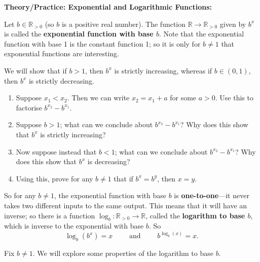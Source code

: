 \documentclass{article}
\begin{document}
\vfill



\clearpage



\textbf{Theory/Practice: Exponential and Logarithmic Functions:}

\vspace{5mm}



Let $b\in\mathbb{R}_{>0}$ (so $b$ is a positive real number). The function $\mathbb{R}\to\mathbb{R}_{>0}$ given by $b^x$ is called the \textbf{exponential function with base $b$}. Note that the exponential function with base 1 is the constant function 1; so it is only for $b\neq 1$ that exponential functions are interesting.

We will show that if $b>1$, then $b^x$ is strictly increasing, whereas if $b\in (0,1)$, then $b^x$ is strictly decreasing.
\begin{enumerate}
	\item Suppose $x_1<x_2$. Then we can write $x_2=x_1+a$ for some $a>0$. Use this to factorise $b^{x_2}-b^{x_1}$.
	\item Suppose $b>1$; what can we conclude about $b^{x_2}-b^{x_1}$? Why does this show that $b^x$ is strictly increasing?
	\item Now suppose instead that $b<1$; what can we conclude about $b^{x_2}-b^{x_1}$? Why does this show that $b^x$ is decreasing?
	\item Using this, prove for any $b\neq 1$ that if $b^x=b^y$, then $x=y$.
\end{enumerate}

So for any $b\neq 1$, the exponential function with base $b$ is \textbf{one-to-one}---it never takes two different inputs to the same output. This means that it will have an inverse; so there is a function $\log_b:\mathbb{R}_{>0}\to\mathbb{R}$, called the \textbf{logarithm to base $b$}, which is inverse to the exponential with base $b$. So
\[\log_b(b^x)=x\qquad\mbox{ and }\qquad b^{\log_b(x)}=x.\]

\noindent Fix $b\neq1$. We will explore some properties of the logarithm to base $b$.
\end{document}
